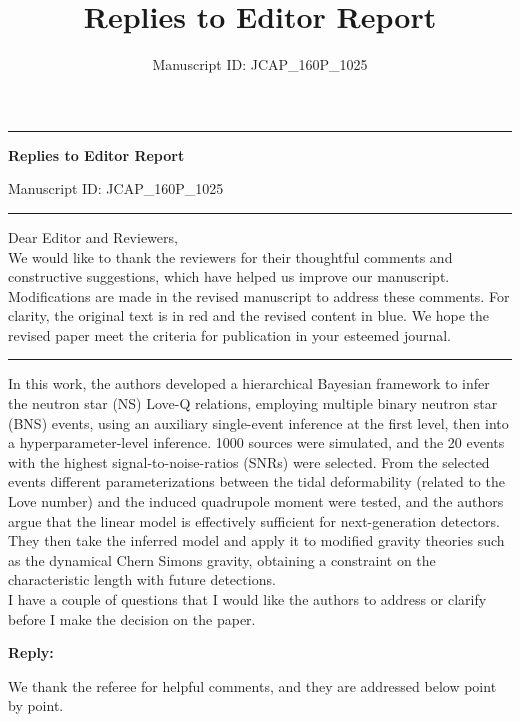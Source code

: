\documentclass[11pt]{article}
\title{Replies to Editor Report}
\author{Manuscript ID: JCAP\_160P\_1025}
\date{}
\newenvironment{authorresponse}{
    \noindent \textbf{Reply:} \normalfont
}{
    \par\vspace{1.5em}
}
\begin{document}
\noindent\rule{\textwidth}{0.8pt}

\begin{center}
{\LARGE\bfseries Replies to Editor Report\par}
\vspace{0.2cm}
{Manuscript ID: JCAP\_160P\_1025\par}
\end{center}
\vspace{-0.2cm}
\noindent\rule{\textwidth}{0.8pt}

\vspace{0.2cm}
\noindent Dear Editor and Reviewers,\\

We would like to thank the reviewers for their thoughtful comments and
constructive suggestions, which have helped us improve our manuscript.
Modifications are made in the revised manuscript to address these comments.
For clarity, the {\color{oldcolor} original text} is in {\color{oldcolor} red}
and the {\color{revcolor} revised content} in {\color{revcolor} blue}. 
We hope the revised paper meet the criteria for publication in your esteemed journal.

\noindent\rule{\textwidth}{0.8pt}

In this work, the authors developed a hierarchical Bayesian framework to
infer the neutron star (NS) Love-Q relations, employing multiple binary neutron star (BNS) events, using an auxiliary single-event inference at the first
level, then into a hyperparameter-level inference. 1000 sources were simulated, and the 20 events with the highest signal-to-noise-ratios (SNRs) were
selected. From the selected events different parameterizations between the
tidal deformability (related to the Love number) and the induced quadrupole
moment were tested, and the authors argue that the linear model is effectively sufficient for next-generation detectors. They then take the inferred
model and apply it to modified gravity theories such as the dynamical Chern Simons gravity, obtaining a constraint on the characteristic length with future
detections. \\

I have a couple of questions that I would like the authors to address or
clarify before I make the decision on the paper.

\begin{authorresponse}
We thank the referee for helpful comments, and they are addressed below point by point.
\end{authorresponse}
\end{document}
